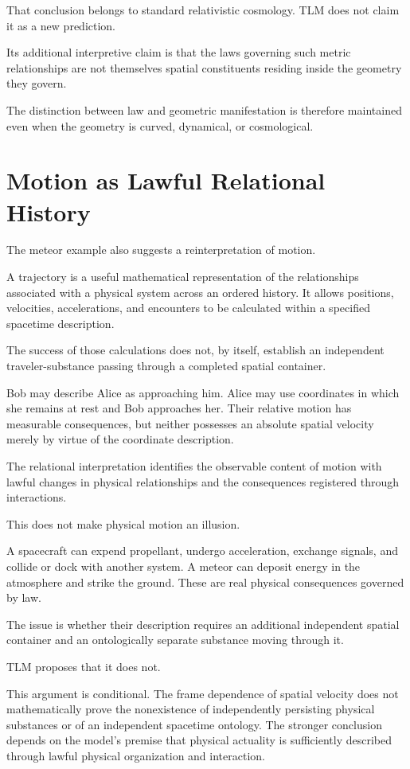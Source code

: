 \documentclass[12pt,onecolumn]{article}
\begin{document}
That conclusion belongs to standard relativistic cosmology. TLM does not claim it as a new prediction.

Its additional interpretive claim is that the laws governing such metric relationships are not themselves spatial constituents residing inside the geometry they govern.

The distinction between law and geometric manifestation is therefore maintained even when the geometry is curved, dynamical, or cosmological.

\section{Motion as Lawful Relational History}

The meteor example also suggests a reinterpretation of motion.

A trajectory is a useful mathematical representation of the relationships associated with a physical system across an ordered history. It allows positions, velocities, accelerations, and encounters to be calculated within a specified spacetime description.

The success of those calculations does not, by itself, establish an independent traveler-substance passing through a completed spatial container.

Bob may describe Alice as approaching him. Alice may use coordinates in which she remains at rest and Bob approaches her. Their relative motion has measurable consequences, but neither possesses an absolute spatial velocity merely by virtue of the coordinate description.

The relational interpretation identifies the observable content of motion with lawful changes in physical relationships and the consequences registered through interactions.

This does not make physical motion an illusion.

A spacecraft can expend propellant, undergo acceleration, exchange signals, and collide or dock with another system. A meteor can deposit energy in the atmosphere and strike the ground. These are real physical consequences governed by law.

The issue is whether their description requires an additional independent spatial container and an ontologically separate substance moving through it.

TLM proposes that it does not.

This argument is conditional. The frame dependence of spatial velocity does not mathematically prove the nonexistence of independently persisting physical substances or of an independent spacetime ontology. The stronger conclusion depends on the model's premise that physical actuality is sufficiently described through lawful physical organization and interaction.
\end{document}
